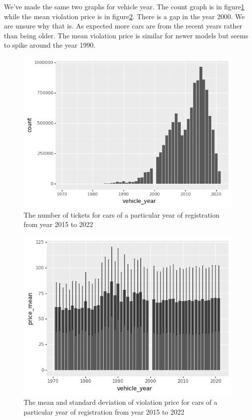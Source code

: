 \documentclass[12pt]{fphw}
\begin{document}
We've made the same two graphs for vehicle year. The count graph is in figure\ref{fig:year_1} while the mean violation price is in figure\ref{fig:year_2}. There is a gap in the year 2000. We are unsure why that is.
As expected more cars are from the recent years rather than being older. The mean violation price is similar for newer models but seems to spike around the year 1990.

\begin{figure}[h!]
  \label{fig:year_1}
  \includegraphics[width=1\textwidth]{figures2/VehicleYear_count.png}
  \caption{The number of tickets for cars of a particular year of registration from year 2015 to 2022}
\end{figure}

\begin{figure}[h!]
  \label{fig:year_2}
  \includegraphics[width=1\textwidth]{figures2/VehicleYear_price.png}
  \caption{The mean and standard deviation of violation price for cars of a particular year of registration from year 2015 to 2022}
\end{figure}
\end{document}
